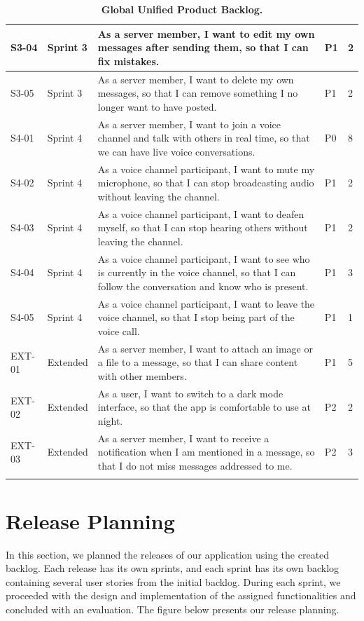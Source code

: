 \begin{longtable}{| p{1.2cm} | p{1.8cm} | p{10.0cm} | p{1.8cm} | p{1.2cm} |}
    \hline
    S3-04 & Sprint 3 & As a server member, I want to edit my own messages after sending them, so that I can fix mistakes. & P1 & 2 \\
    \hline
    S3-05 & Sprint 3 & As a server member, I want to delete my own messages, so that I can remove something I no longer want to have posted. & P1 & 2 \\
    \hline
    S4-01 & Sprint 4 & As a server member, I want to join a voice channel and talk with others in real time, so that we can have live voice conversations. & P0 & 8 \\
    \hline
    S4-02 & Sprint 4 & As a voice channel participant, I want to mute my microphone, so that I can stop broadcasting audio without leaving the channel. & P1 & 2 \\
    \hline
    S4-03 & Sprint 4 & As a voice channel participant, I want to deafen myself, so that I can stop hearing others without leaving the channel. & P1 & 2 \\
    \hline
    S4-04 & Sprint 4 & As a voice channel participant, I want to see who is currently in the voice channel, so that I can follow the conversation and know who is present. & P1 & 3 \\
    \hline
    S4-05 & Sprint 4 & As a voice channel participant, I want to leave the voice channel, so that I stop being part of the voice call. & P1 & 1 \\
    \hline
    EXT-01 & Extended & As a server member, I want to attach an image or a file to a message, so that I can share content with other members. & P1 & 5 \\
    \hline
    EXT-02 & Extended & As a user, I want to switch to a dark mode interface, so that the app is comfortable to use at night. & P2 & 2 \\
    \hline
    EXT-03 & Extended & As a server member, I want to receive a notification when I am mentioned in a message, so that I do not miss messages addressed to me. & P2 & 3 \\
    \hline
    \caption{\textbf{Global Unified Product Backlog.}}
    \label{tab:global_backlog} \\
\end{longtable}
\normalsize

\section{Release Planning}
In this section, we planned the releases of our application using the created backlog. Each release has its own sprints, and each sprint has its own backlog containing several user stories from the initial backlog. During each sprint, we proceeded with the design and implementation of the assigned functionalities and concluded with an evaluation. The figure below presents our release planning.

